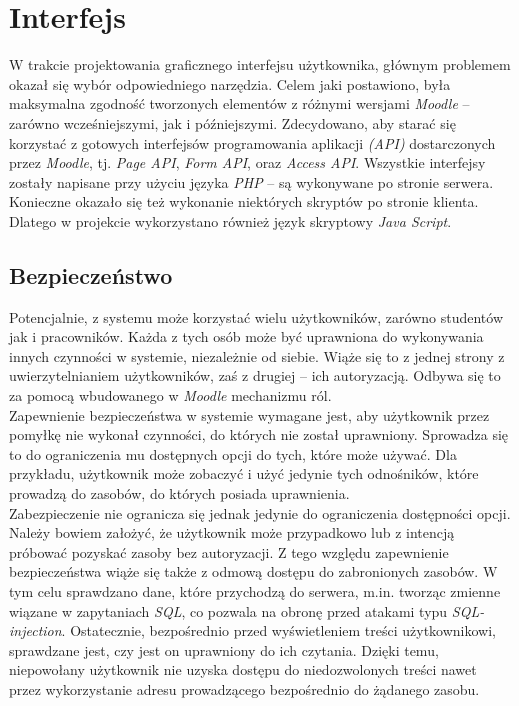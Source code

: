 
\section{Interfejs}
\label{Chapter65}

W trakcie projektowania graficznego interfejsu użytkownika, głównym problemem okazał się wybór odpowiedniego narzędzia. Celem jaki postawiono, była maksymalna zgodność tworzonych elementów z różnymi wersjami \textit{Moodle} -- zarówno wcześniejszymi, jak i późniejszymi. Zdecydowano, aby starać się korzystać z gotowych interfejsów programowania aplikacji \textit{(API)} dostarczonych przez \textit{Moodle}, tj. \textit{Page API}, \textit{Form API}, oraz \textit{Access API}. Wszystkie interfejsy zostały napisane przy użyciu języka \textit{PHP} -- są wykonywane po stronie serwera. Konieczne okazało się też wykonanie niektórych skryptów po stronie klienta. Dlatego w projekcie wykorzystano również język skryptowy \textit{Java Script}.

\subsection{Bezpieczeństwo}

Potencjalnie, z systemu może korzystać wielu użytkowników, zarówno studentów jak i pracowników. Każda z tych osób może być uprawniona do wykonywania innych czynności w systemie, niezależnie od siebie. Wiąże się to z jednej strony z uwierzytelnianiem użytkowników, zaś z drugiej -- ich autoryzacją. Odbywa się to za pomocą wbudowanego w \textit{Moodle} mechanizmu ról. \\

Zapewnienie bezpieczeństwa w systemie wymagane jest, aby użytkownik przez pomyłkę nie wykonał czynności, do których nie został uprawniony. Sprowadza się to do ograniczenia mu dostępnych opcji do tych, które może używać. Dla przykładu, użytkownik może zobaczyć i użyć jedynie tych odnośników, które prowadzą do zasobów, do których posiada uprawnienia. \\

Zabezpieczenie nie ogranicza się jednak jedynie do ograniczenia dostępności opcji. Należy bowiem założyć, że użytkownik może przypadkowo lub z intencją próbować pozyskać zasoby bez autoryzacji. Z tego względu zapewnienie bezpieczeństwa wiąże się także z odmową dostępu do zabronionych zasobów. W tym celu sprawdzano dane, które przychodzą do serwera, m.in. tworząc zmienne wiązane w zapytaniach \textit{SQL}, co pozwala na obronę przed atakami typu \textit{SQL-injection}. Ostatecznie, bezpośrednio przed wyświetleniem treści użytkownikowi, sprawdzane jest, czy jest on uprawniony do ich czytania. Dzięki temu, niepowołany użytkownik nie uzyska dostępu do niedozwolonych treści nawet przez wykorzystanie adresu prowadzącego bezpośrednio do żądanego zasobu.
